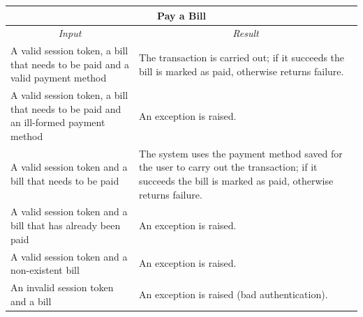 \documentclass[english]{article}
\begin{document}
\begin{center}
	\begin{tabular}{ | p{6cm} | p{6cm} | }
		\hline 
		\multicolumn{2}{|c|}{\textbf{Pay a Bill}} \\
		\hline
		\multicolumn{1}{|c|}{\textit{Input}} & \multicolumn{1}{c|}{\textit{Result}} \\
		\hline
		A valid session token, a bill that needs to be paid and a valid payment method &  The transaction is carried out; if it succeeds the bill is marked as paid, otherwise returns failure. \\
		\hline
		A valid session token, a bill that needs to be paid and an ill-formed payment method & An exception is raised. \\
		\hline
		A valid session token and a bill that needs to be paid & The system uses the payment method saved for the user to carry out the transaction; if it succeeds the bill is marked as paid, otherwise returns failure. \\
		\hline
		A valid session token and a bill that has already been paid & An exception is raised. \\
		\hline
		A valid session token and a non-existent bill & An exception is raised. \\
		\hline
		An invalid session token and a bill & An exception is raised (bad authentication). \\
		\hline
	\end{tabular}
\end{center}

\begin{table}[H]
	\centering
	\caption{asdfasdf}
\end{table}

\begin{table}[H]
	\centering
	\caption{ewerewr}
\end{table}
\end{document}

